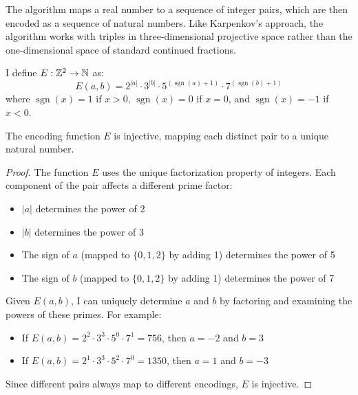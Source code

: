 The algorithm maps a real number to a sequence of integer pairs, which are then encoded as a sequence of natural numbers. Like Karpenkov's approach, the \HAPD{} algorithm works with triples in three-dimensional projective space rather than the one-dimensional space of standard continued fractions.

\begin{definition}\label{def:encoding}
I define $E : \mathbb{Z}^2 \to \mathbb{N}$ as:
\begin{equation}
E(a, b) = 2^{|a|} \cdot 3^{|b|} \cdot 5^{(\operatorname{sgn}(a)+1)} \cdot 7^{(\operatorname{sgn}(b)+1)}
\end{equation}
where $\operatorname{sgn}(x) = 1$ if $x > 0$, $\operatorname{sgn}(x) = 0$ if $x = 0$, and $\operatorname{sgn}(x) = -1$ if $x < 0$.
\end{definition}

\begin{lemma}\label{lem:encoding_injective}
The encoding function $E$ is injective, mapping each distinct pair to a unique natural number.
\end{lemma}

\begin{proof}
The function $E$ uses the unique factorization property of integers. Each component of the pair affects a different prime factor:
\begin{itemize}
    \item $|a|$ determines the power of 2
    \item $|b|$ determines the power of 3
    \item The sign of $a$ (mapped to $\{0,1,2\}$ by adding 1) determines the power of 5
    \item The sign of $b$ (mapped to $\{0,1,2\}$ by adding 1) determines the power of 7
\end{itemize}

Given $E(a,b)$, I can uniquely determine $a$ and $b$ by factoring and examining the powers of these primes. For example:
\begin{itemize}
    \item If $E(a,b) = 2^2 \cdot 3^3 \cdot 5^0 \cdot 7^1 = 756$, then $a = -2$ and $b = 3$
    \item If $E(a,b) = 2^1 \cdot 3^3 \cdot 5^2 \cdot 7^0 = 1350$, then $a = 1$ and $b = -3$
\end{itemize}

Since different pairs always map to different encodings, $E$ is injective.
\end{proof}

